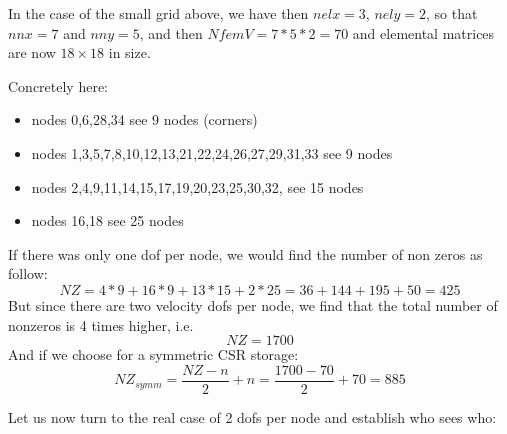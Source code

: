 \begin{center}

\end{center}

In the case of the small grid above, we have then 
$nelx=3$, $nely=2$, so that $nnx=7$ and $nny=5$, and then
$NfemV=7*5*2=70$ and elemental matrices are now $18\times18$ in size.


\begin{center}

\end{center}


Concretely here:
\begin{itemize}
\item nodes {\color{teal} 0,6,28,34} see 9 nodes (corners)
\item nodes 1,3,5,7,8,10,12,13,21,22,24,26,27,29,31,33 see 9 nodes
\item nodes 2,4,9,11,14,15,17,19,20,23,25,30,32, see 15 nodes
\item nodes 16,18 see 25 nodes
\end{itemize}

If there was only one dof per node, we would find 
the number of non zeros as follow:
\[
NZ=4*9 + 16*9 + 13*15 + 2*25 = 36+144 + 195 + 50 = 425
\]
But since there are two velocity dofs per node, we find that 
the total number of nonzeros is 4 times higher, i.e.
\[
NZ=1700
\] 
And if we choose for a symmetric CSR storage:
\[
NZ_{symm} = \frac{NZ-n}{2}+n = \frac{1700-70}{2} + 70 = 885 
\]

Let us now turn to the real case of 2 dofs per node and establish who sees who:

